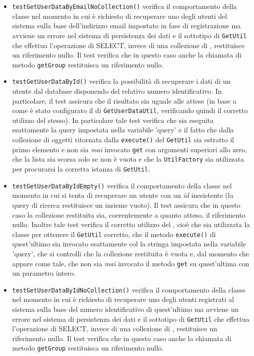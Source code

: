 \begin{itemize}
\begin{itemize}
\item \texttt{testGetUserDataByEmailNoCollection()} verifica il comportamento della classe nel momento in cui è richiesto di recuperare uno degli utenti del sistema sulla base dell'indirizzo email impostato in fase di registrazione ma avviene un errore nel sistema di persistenza dei dati e il sottotipo di \texttt{GetUtil} che effettua l'operazione di SELECT, invece di una collezione di , restituisce un riferimento nullo. Il test verifica che in questo caso anche la chiamata di metodo \texttt{getGroup} restituisca un riferimento nullo.

\item \texttt{testGetUserDataById()} verifica la possibilità di recuperare i dati di un utente dal database disponendo del relativo numero identificativo. In particolare, il test assicura che il risultato sia uguale alle attese (in base a come è stato configurato il  di \texttt{GetUserDataUtil}, verificando quindi il corretto utilizzo del  stesso). In particolare tale test verifica che sia eseguita esattamente la query impostata nella variabile 'query' e il fatto che dalla collezione di oggetti ritornata dalla \texttt{execute()} del \texttt{GetUtil} sia estratto il primo elemento e non sia \textit{mai} invocato \texttt{get} con argomenti superiori allo zero, che la lista sia scorsa solo se non è vuota e che la \texttt{UtilFactory} sia utilizzata per procurarsi la corretta istanza di \texttt{GetUtil}.

\item \texttt{testGetUserDataByIdEmpty()} verifica il comportamento della classe nel momento in cui si tenta di recuperare un utente con un \textit{id} inesistente (la query di ricerca restituisce un insieme vuoto). Il test assicura che in questo caso la collezione restituita sia, coerentemente a quanto atteso, il riferimento nullo. Inoltre tale test verifica il corretto utilizzo del , cioè che sia utilizzata la classe  per ottenere il \texttt{GetUtil} corretto, che il metodo \texttt{execute()} di quest'ultimo sia invocato esattamente col la stringa impostata nella variabile 'query', che si controlli che la collezione restituita è vuota e, dal momento che appare come tale, che non sia \textit{mai} invocato il metodo \texttt{get} su quest'ultima con un parametro intero.

\item \texttt{testGetUserDataByIdNoCollection()} verifica il comportamento della classe nel momento in cui è richiesto di recuperare uno degli utenti registrati al sistema sulla base del numero identificativo di quest'ultimo ma avviene un errore nel sistema di persistenza dei dati e il sottotipo di \texttt{GetUtil} che effettua l'operazione di SELECT, invece di una collezione di , restituisce un riferimento nullo. Il test verifica che in questo caso anche la chiamata di metodo \texttt{getGroup} restituisca un riferimento nullo.


\end{itemize}
\end{itemize}
